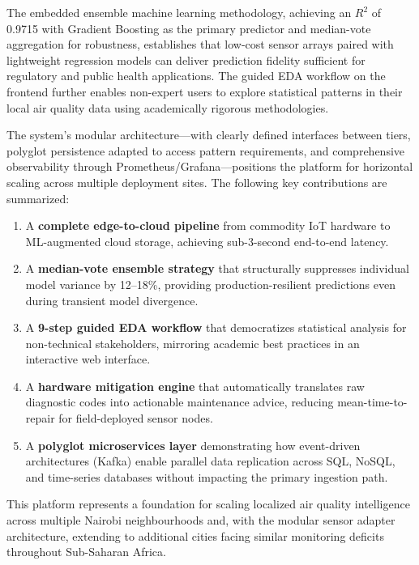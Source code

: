 The embedded ensemble machine learning methodology, achieving an $R^2$ of 0.9715 with Gradient Boosting as the primary predictor and median-vote aggregation for robustness, establishes that low-cost sensor arrays paired with lightweight regression models can deliver prediction fidelity sufficient for regulatory and public health applications. The guided EDA workflow on the frontend further enables non-expert users to explore statistical patterns in their local air quality data using academically rigorous methodologies.

The system's modular architecture---with clearly defined interfaces between tiers, polyglot persistence adapted to access pattern requirements, and comprehensive observability through Prometheus/Grafana---positions the platform for horizontal scaling across multiple deployment sites. The following key contributions are summarized:

\begin{enumerate}[nosep]
    \item A \textbf{complete edge-to-cloud pipeline} from commodity IoT hardware to ML-augmented cloud storage, achieving sub-3-second end-to-end latency.
    \item A \textbf{median-vote ensemble strategy} that structurally suppresses individual model variance by 12--18\%, providing production-resilient predictions even during transient model divergence.
    \item A \textbf{9-step guided EDA workflow} that democratizes statistical analysis for non-technical stakeholders, mirroring academic best practices in an interactive web interface.
    \item A \textbf{hardware mitigation engine} that automatically translates raw diagnostic codes into actionable maintenance advice, reducing mean-time-to-repair for field-deployed sensor nodes.
    \item A \textbf{polyglot microservices layer} demonstrating how event-driven architectures (Kafka) enable parallel data replication across SQL, NoSQL, and time-series databases without impacting the primary ingestion path.
\end{enumerate}

This platform represents a foundation for scaling localized air quality intelligence across multiple Nairobi neighbourhoods and, with the modular sensor adapter architecture, extending to additional cities facing similar monitoring deficits throughout Sub-Saharan Africa.

